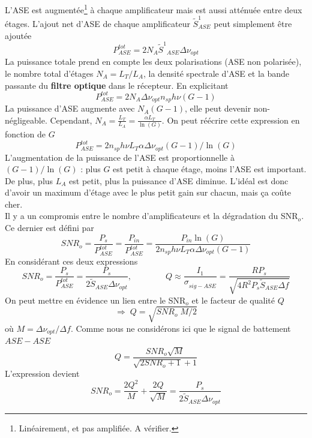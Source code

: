 L'ASE est augmentée\footnote{Linéairement, et pas amplifiée. A vérifier.} à chaque amplificateur mais 
est aussi atténuée entre deux étages. L'ajout net d'ASE de chaque amplificateur $\tilde{S}_{ASE}^1$ peut 
simplement être ajoutée
\begin{equation}
P_{ASE}^{tot} = 2{N_A}{\tilde S^1}_{ASE}\Delta {\nu _{opt}}
\end{equation}
La puissance totale prend en compte les deux polarisations (ASE non polarisée), le nombre total d'étages
$N_A=L_T/L_A$, la densité spectrale d'ASE et la bande passante du \textbf{filtre optique} dans le récepteur.
En explicitant
\begin{equation}
P_{ASE}^{tot} = 2{N_A}\Delta {\nu _{opt}}{n_{sp}}h\nu (G - 1)
\end{equation}
La puissance d'ASE augmente avec $N_A(G-1)$, elle peut devenir non-négligeable. Cependant, 
${N_A} = \frac{{{L_T}}}{{{L_A}}} = \frac{{\alpha {L_T}}}{{\ln (G)}}$. On peut réécrire cette expression
en fonction de $G$
\begin{equation}
P_{ASE}^{tot} = 2{n_{sp}}h\nu {L_T}\alpha \Delta {\nu _{opt}}(G - 1)/\ln (G)
\end{equation}
L'augmentation de la puissance de l'ASE est proportionnelle à $(G - 1)/\ln (G)$ : plus $G$ est petit à chaque
étage, moins l'ASE est important. De plus, plus $L_A$ est petit, plus la puissance d'ASE diminue. L'idéal est 
donc d'avoir un maximum d'étage avec le plus petit gain sur chacun, mais ça coûte cher. \\

Il y a un compromis entre le nombre d'amplificateurs et la dégradation du SNR$_o$. Ce dernier est défini par
\begin{equation}
SN{R_o} = \frac{{{P_s}}}{{P_{ASE}^{tot}}} = \frac{{{P_{in}}}}{{P_{ASE}^{tot}}} = \frac{{{P_{in}}\ln (G)}}{{2{n_{sp}}h\nu {L_T}\alpha \Delta {\nu _{opt}}(G - 1)}}
\end{equation}
En considérant ces deux expressions
\begin{equation}
SN{R_o} = \frac{{{P_s}}}{{P_{ASE}^{tot}}} = \frac{{{P_s}}}{{2{{\tilde S}_{ASE}}\Delta {\nu _{opt}}}},\qquad\qquad
Q \approx \frac{{{I_1}}}{{\sigma _{sig - ASE}^{}}} = \frac{{R{P_s}}}{{\sqrt {4{R^2}{P_s}{{\tilde S}_{ASE}}\Delta f} 
}}
\end{equation}
On peut mettre en évidence un lien entre le SNR$_o$ et le facteur de qualité $Q$
\begin{equation}
 \Rightarrow \;Q = \sqrt {SN{R_o}\;M/2} 
\end{equation}
où $M = \Delta {\nu _{opt}}/\Delta f$. Comme nous ne considérons ici que le signal de battement $ASE-ASE$
\begin{equation}
Q = \frac{{SN{R_o}\sqrt M }}{{\sqrt {2SN{R_o} + 1}  + 1}}
\end{equation}
L'expression devient
\begin{equation}
SN{R_o} = \frac{{2{Q^2}}}{M} + \frac{{2Q}}{{\sqrt M }} = \frac{{{P_s}}}{{2{{\tilde S}_{ASE}}\Delta {\nu _{opt}}}}
\end{equation}

